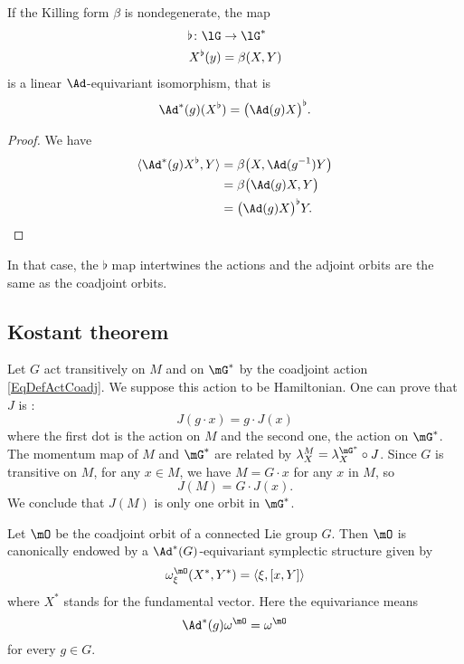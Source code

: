 \begin{lemma}
	If the Killing form $\beta$ is nondegenerate, the map
	\begin{equation}
		\begin{aligned}
			\flat\colon \lG&\to \lG^* \\
			X^{\flat}(y)&=\beta(X,Y) 
		\end{aligned}
	\end{equation}
	is a linear $\Ad$-equivariant isomorphism, that is
	\begin{equation}
		\Ad^*(g)(X^{\flat})=\big( \Ad(g)X \big)^{\flat}.
	\end{equation}
\end{lemma}

\begin{proof}
	We have
	\begin{equation}
		\begin{aligned}[]
			\langle \Ad^*(g)X^{\flat}, Y\rangle &=\beta\big( X,\Ad(g^{-1})Y \big)\\
				&=\beta\big( \Ad(g)X,Y \big)\\
				&=\big( \Ad(g)X \big)^{\flat}Y.
		\end{aligned}
	\end{equation}
\end{proof}
In that case, the $\flat$ map intertwines the actions and the adjoint orbits are the same as the coadjoint orbits.


\subsection{Kostant theorem} 

Let $G$ act transitively on $M$ and on $\mG^*$ by the coadjoint action \eqref{EqDefActCoadj}. We suppose this action to be Hamiltonian. One can prove that $J$ is :
\begin{equation}
  J(g\cdot x)=g\cdot J(x)
\end{equation}
where the first dot is the action on $M$ and the second one, the action on $\mG^*$. The momentum map of $M$ and $\mG^*$ are related by $\lambda_X^M=\lambda_X^{\mG^*}\circ J$. Since $G$ is transitive on $M$, for any $x\in M$, we have $M=G\cdot x$ for any $x$ in $M$, so
\[ 
  J(M)=G\cdot J(x).
\]
We conclude that $J(M)$ is only one orbit in $\mG^*$. 

\begin{proposition}
	Let $\mO$ be the coadjoint orbit of a connected Lie group $G$. Then $\mO$ is canonically endowed by a $\Ad^*(G)$-equivariant symplectic structure given by
	\begin{equation}		\label{EqKKSsymple}
		\omega^{\mO}_{\xi}(X^*,Y^*)=\langle \xi, [x,Y]\rangle 
	\end{equation}
	where $X^*$ stands for the fundamental vector. Here the equivariance means
	\begin{equation}
		\Ad^*(g)\omega^{\mO}=\omega^{\mO}
	\end{equation}
	for every $g\in G$.
\end{proposition}

